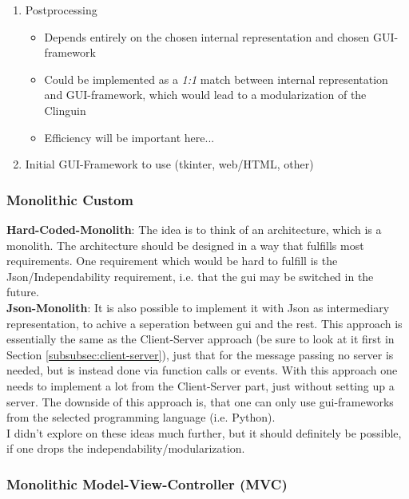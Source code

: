 \documentclass[12pt,a4paper]{article}
\newcommand{\<}[1]{\guilsinglleft}
\renewcommand{\>}[1]{\guilsinglright}
\begin{document}
\begin{enumerate}
\begin{itemize}
\begin{itemize}
        \end{itemize}
    \end{itemize}
    \item Postprocessing
    \begin{itemize}
        \item Depends entirely on the chosen internal representation and chosen GUI-framework
        \item Could be implemented as a \textit{1:1} match between internal representation and GUI-framework, which would lead to a modularization of the Clinguin
        \item Efficiency will be important here...
    \end{itemize}
    \item Initial GUI-Framework to use (tkinter, web/HTML, other)
\end{enumerate}


\subsubsection{Monolithic Custom}

\noindent \textbf{Hard-Coded-Monolith}: The idea is to think of an architecture, which is a monolith. The architecture should be designed in a way that fulfills most requirements. One requirement which would be hard to fulfill is the Json/Independability requirement, i.e. that the gui may be switched in the future.\\[1em]
\noindent \textbf{Json-Monolith}: It is also possible to implement it with Json as intermediary representation, to achive a seperation between gui and the rest. This approach is essentially the same as the Client-Server approach (be sure to look at it first in Section \ref{subsubsec:client-server}), just that for the message passing no server is needed, but is instead done via function calls or events. With this approach one needs to implement a lot from the Client-Server part, just without setting up a server. The downside of this approach is, that one can only use gui-frameworks from the selected programming language (i.e. Python).\\[1em]
I didn't explore on these ideas much further, but it should definitely be possible, if one drops the independability/modularization.

\subsubsection{Monolithic Model-View-Controller (MVC)}
\end{document}

